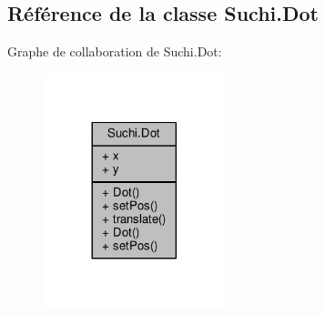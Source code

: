 \hypertarget{classSuchi_1_1Dot}{}\subsection{Référence de la classe Suchi.\+Dot}
\label{classSuchi_1_1Dot}


Graphe de collaboration de Suchi.\+Dot\+:\nopagebreak
\begin{figure}[H]
\begin{center}
\leavevmode
\includegraphics[width=149pt]{classSuchi_1_1Dot__coll__graph}
\end{center}
\end{figure}
